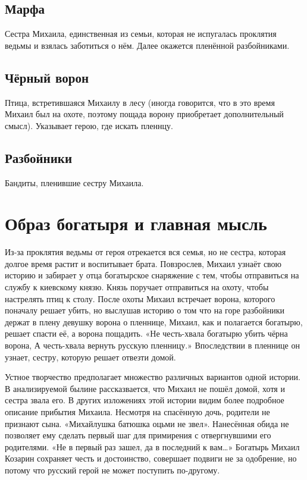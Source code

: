 \documentclass[12pt]{article}
\begin{document}
\subsection{Марфа}
Сестра Михаила, единственная из семьи, которая не испугалась проклятия ведьмы и взялась заботиться о нём. Далее окажется пленённой разбойниками.

\subsection{Чёрный ворон}
Птица, встретившаяся Михаилу в лесу (иногда говорится, что в это время Михаил был на охоте, поэтому пощада ворону приобретает дополнительный смысл). Указывает герою, где искать пленнцу.

\subsection{Разбойники}
Бандиты, пленившие сестру Михаила.



\section{Образ богатыря и главная мысль}

Из-за проклятия ведьмы от героя отрекается вся семья, но не сестра, которая долгое время растит и воспитывает брата. Повзрослев, Михаил узнаёт свою историю и забирает у отца богатырское снаряжение с тем, чтобы отправиться на службу к киевскому князю.
Князь поручает отправиться на охоту, чтобы настрелять птиц к столу. После охоты Михаил встречает ворона, которого поначалу решает убить, но выслушав историю о том что на горе разбойники держат в плену девушку ворона о пленнице, Михаил, как и полагается богатырю, решает спасти её, а ворона пощадить. «Не честь-хвала богатырю убить чёрна ворона, А честь-хвала вернуть русскую пленницу.» Впоследствии в пленнице он узнает, сестру, которую решает отвезти домой.

Устное творчество предполагает множество различных вариантов одной истории. В анализируемой былине рассказвается, что Михаил не пошёл домой, хотя и сестра звала его. В других изложениях этой истории видим более подробное описание прибытия Михаила. Несмотря на спасённую дочь, родители не признают сына. « Михайлушка батюшка оцьми не звел». Нанесённая обида не позволяет ему сделать первый шаг для примирения с отвергнувшими его родителями. «Не в первый раз зашел, да в последний к вам\ldots» Богатырь Михаил Козарин сохраняет честь и достоинство, совершает подвиги не за одобрение, но потому что русский герой не может поступить по-другому.
\end{document}
